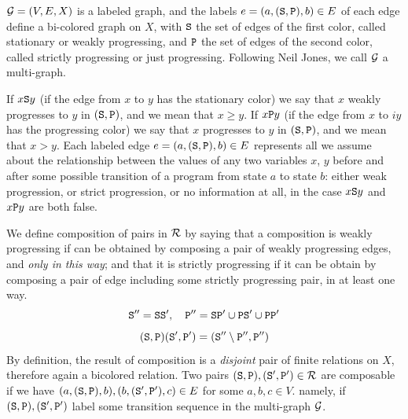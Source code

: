 \documentclass{lmcs}
\begin{document}
${\mathcal G}=(V,E,X)$ is a labeled graph, and the labels $e = (a, ({\tt S}, {\tt P}), b) \in E$ of each edge
define a bi-colored graph on $X$, with ${\tt S}$ the set of edges of the first color, called
stationary or weakly progressing, and ${\tt P}$ the set of edges of the second color,
called strictly progressing or just progressing.
Following Neil Jones, we call ${\mathcal G}$ a multi-graph.

If $x {\tt S} y$ (if the edge from $x$ to $y$ has the stationary color)
we say that $x$ weakly progresses to $y$ in $({\tt S}, {\tt P})$, and we mean that $x \ge y$.
If $x {\tt P} y$ (if the edge from $x$ to $iy$ has the progressing color)
we say that $x$ progresses to $y$ in $({\tt S}, {\tt P})$, and we mean that $x > y$.
Each labeled edge $e = (a, ({\tt S}, {\tt P}), b) \in E$ represents all
we assume about the relationship between the values of any two variables $x$, $y$ before
and after some possible transition of a program from state $a$ to state $b$: 
either weak progression, or strict progression, 
or no information at all, in the case $x {\tt S} y$ and $x {\tt P} y$ are both false.

We define composition of pairs in ${\mathcal R}$ by saying that a composition is weakly
progressing if can be obtained by composing a pair of weakly progressing edges,
and \emph{only in this way};
and that it is strictly progressing if it can be obtain by composing a pair of edge including
some strictly progressing pair, in at least one way.
$$
\Stat'' = \Stat \Stat', 
\ \ \ 
\Prog'' = \Stat \Prog' \cup \Prog \Stat' \cup \Prog \Prog'
$$
$$
({\tt S},{\tt P})({\tt S}',{\tt P}') 
=
({\tt S}''\setminus{\tt P}'', {\tt P}'')
$$
By definition, the result of composition is a \emph{disjoint} 
pair of finite relations on $X$, therefore again a bicolored relation.
Two pairs $({\tt S}, {\tt P}), ({\tt S}', {\tt P}') \in {\mathcal R}$ are composable
if we have $(a, ({\tt S}, {\tt P}), b), (b, ({\tt S}', {\tt P}'), c) \in E$ for some $a,b,c \in V$.
namely, if $({\tt S}, {\tt P}), ({\tt S}', {\tt P}')$ label some transition sequence in the
multi-graph ${\mathcal G}$.
\end{document}
